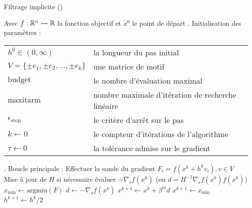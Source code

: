 \begin{algorithm}[H]
	\caption{\textsf{Filtrage implicite} (\imfil)}
	\label{alg5}
	\begin{algorithmic}
		\STATE Avec $f:\mathbb{R}^n \rightarrowtail \mathbb{R}$ la fonction objectif et $x^0$ le point de départ
		. \textsf{Initialisation des paramètres} :
		\bindent 
		\STATE\begin{flushleft}
			\begin{tabular}{l l}
				$h^0 \in (0,\infty)$ & la longueur du pas initial\\
				$V = \{\pm e_1,\pm e_2,\dots,\pm e_k\}$ & une matrice de motif\\
				$\text{budget}$ & le nombre d'évaluation maximal\\
				$\text{maxitarm}$ & nombre maximale d'itération de recherche linéaire\\
				$\epsilon_{\text{stop}} $ & le critère d'arrêt sur le pas\\
				$k \leftarrow 0$ & le compteur d'itérations de l'algorithme\\
				$\tau \leftarrow 0$ & la tolérance admise sur le gradient\\
			\end{tabular}
		\end{flushleft}
		\eindent
		. \textsf{Boucle principale} :
		\bindent 
		\STATE Effectuer la sonde du gradient
		\STATE $F_i = f(x^k + h^k v_i), v \in V$
		\ENDFOR
		\STATE Mise à jour de $H$ si nécessaire
		\STATE évaluer $-\nabla_{s}f(x^k)$    (ou $d = H^{-1}\nabla_{s}f(x^k)f(x^k)$)
		\STATE $x_{\min}\leftarrow\text{argmin}(F)$
		\STATE $d \leftarrow -\nabla_{s}f(x^k)$
		\STATE $ x^{k+1} \leftarrow x^k + \beta^m d$ 
		\ELSE
		\STATE $x^{k+1} \leftarrow x_{\min}$
		\ENDIF
		\ELSE
		\STATE $h^{k+1} \leftarrow {h^k}/{2}$
		\ENDIF
		\ENDWHILE
		\eindent
	\end{algorithmic}
\end{algorithm}

